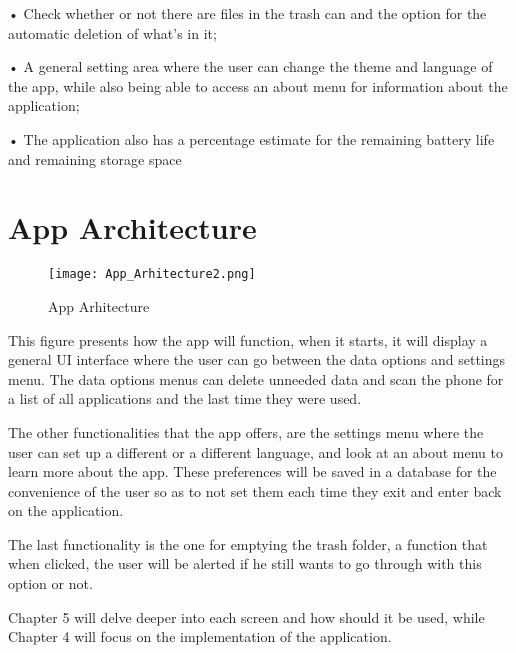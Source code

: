     • Check whether or not there are files in the trash can and the option for the automatic deletion of what's in it;

    • A general setting area where the user can change the theme and language of the app, while also being able to access an about menu for information about the application;

    • The application also has a percentage estimate for the remaining battery life and remaining storage space
    
\newpage


\newpage

\section{App Architecture}\label{sect:app architecture}

\begin{figure}[htp]
    \centering
    \texttt{[image: App\_Arhitecture2.png]}
    \caption{App Arhitecture}
    \label{fig: App Arhitecture}
\end{figure}

This figure presents how the app will function, when it starts, it will display a general \ac{UI} interface where the user can go between the data options and settings menu. The data options menus can delete unneeded data and scan the phone for a list of all applications and the last time they were used. 

The other functionalities that the app offers, are the settings menu where the user can set up a different or a different language, and look at an about menu to learn more about the app. These preferences will be saved in a database for the convenience of the user so as to not set them each time they exit and enter back on the application. 

The last functionality is the one for emptying the trash folder, a function that when clicked, the user will be alerted if he still wants to go through with this option or not.

Chapter 5 will delve deeper into each screen and how should it be used, while Chapter 4 will focus on the implementation of the application.
